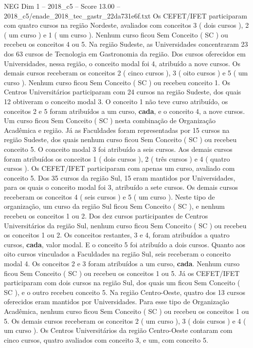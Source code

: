 \begin{textsample}{NEG Dim 1 – 2018\_c5 – Score 13.00 – 2018\_c5/enade\_2018\_tec\_gastr\_22da731e6f.txt}
Os CEFET/IFET participaram com quatro cursos na região Nordeste, avaliados com conceitos 3 ( dois cursos ), 2 ( um curso ) e 1 ( um curso ).
Nenhum curso ficou Sem Conceito ( SC ) ou recebeu os conceitos 4 ou 5.
Na região Sudeste, as Universidades concentraram 23 dos 63 cursos de Tecnologia em Gastronomia da região.
Dos cursos oferecidos em Universidades, nessa região, o conceito modal foi 4, atribuído a nove cursos.
Os demais cursos receberam os conceitos 2 ( cinco cursos ), 3 ( oito cursos ) e 5 ( um curso ).
Nenhum curso ficou Sem Conceito ( SC ) ou recebeu conceito 1.
Os Centros Universitários participaram com 24 cursos na região Sudeste, dos quais 12 obtiveram o conceito modal 3.
O conceito 1 não teve curso atribuído, os conceitos 2 e 5 foram atribuídos a um curso, \textbf{cada}, e o conceito 4, a nove cursos.
Um curso ficou Sem Conceito ( SC ) nesta combinação de Organização Acadêmica e região.
Já as Faculdades foram representadas por 15 cursos na região Sudeste, dos quais nenhum curso ficou Sem Conceito ( SC ) ou recebeu conceito 5.
O conceito modal 3 foi atribuído a seis cursos.
Aos demais cursos foram atribuídos os conceitos 1 ( dois cursos ), 2 ( três cursos ) e 4 ( quatro cursos ).
Os CEFET/IFET participaram com apenas um curso, avaliado com conceito 5.
Dos 35 cursos da região Sul, 15 eram mantidos por Universidades, para os quais o conceito modal foi 3, atribuído a sete cursos.
Os demais cursos receberam os conceitos 4 ( seis cursos ) e 5 ( um curso ).
Neste tipo de organização, um curso da região Sul ficou Sem Conceito ( SC ), e nenhum recebeu os conceitos 1 ou 2.
Dos dez cursos participantes de Centros Universitários da região Sul, nenhum curso ficou Sem Conceito ( SC ) ou recebeu os conceitos 1 ou 2.
Os conceitos restantes, 3 e 4, foram atribuídos a quatro cursos, \textbf{cada}, valor modal.
E o conceito 5 foi atribuído a dois cursos.
Quanto aos oito cursos vinculados a Faculdades na região Sul, seis receberam o conceito modal 4.
Os conceitos 2 e 3 foram atribuídos a um curso, \textbf{cada}.
Nenhum curso ficou Sem Conceito ( SC ) ou recebeu os conceitos 1 ou 5.
Já os CEFET/IFET participaram com dois cursos na região Sul, dos quais um ficou Sem Conceito ( SC ), e o outro recebeu conceito 5.
Na região Centro-Oeste, quatro dos 13 cursos oferecidos eram mantidos por Universidades.
Para esse tipo de Organização Acadêmica, nenhum curso ficou Sem Conceito ( SC ) ou recebeu os conceitos 1 ou 5.
Os demais cursos receberam os conceitos 2 ( um curso ), 3 ( dois cursos ) e 4 ( um curso ).
Os Centros Universitários da região Centro-Oeste contaram com cinco cursos, quatro avaliados com conceito 3, e um, com conceito 5.

\end{textsample}
